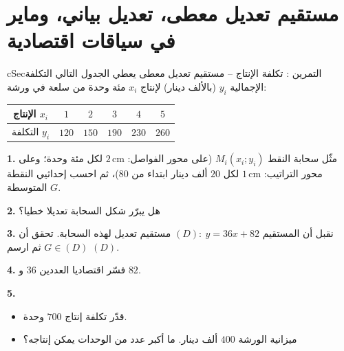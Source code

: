 \documentclass[12pt,a4paper]{article}
\newenvironment{BOX}[2]{\begin{otherlanguage}{english}\begin{arbox}{#1}{#2}}{\end{arbox}\end{otherlanguage}}
\newcounter{exo}
\newenvironment{tamrin}[1]{\stepcounter{exo}\begin{BOX}{cSec}{التمرين \theexo: #1}}{\end{BOX}}
\newenvironment{LTR}{\begin{otherlanguage}{english}}{\end{otherlanguage}}
\newcommand{\ar}[1]{\foreignlanguage{arabic}{#1}}
\newenvironment{sq}{\begin{itemize}[leftmargin=2.4em,itemsep=3pt]}{\end{itemize}}
\newcommand{\qa}{\item[(أ)]}\newcommand{\qb}{\item[(ب)]}\newcommand{\qc}{\item[(جـ)]}\newcommand{\qd}{\item[(د)]}\newcommand{\qe}{\item[(هـ)]}
\newcommand{\QQ}[1]{\par\smallskip\textbf{#1.} }
\begin{document}
\section{مستقيم تعديل معطى، تعديل بياني، وماير في سياقات اقتصادية}
\begin{tamrin}{تكلفة الإنتاج -- مستقيم تعديل معطى}
يعطي الجدول التالي التكلفة الإجمالية $y_i$ (بالألف دينار) لإنتاج $x_i$ مئة وحدة من سلعة في ورشة:
\begin{center}\begin{LTR}\renewcommand{\arraystretch}{1.35}\small
\begin{tabular}{|c|c|c|c|c|c|}\hline
\rowcolor{cSec!12}\ar{الإنتاج} $x_i$ & $1$ & $2$ & $3$ & $4$ & $5$\\\hline
\ar{التكلفة} $y_i$ & $120$ & $150$ & $190$ & $230$ & $260$\\\hline
\end{tabular}\end{LTR}\end{center}
\QQ{1} مثّل سحابة النقط $M_i(x_i;y_i)$ (على محور الفواصل: $2\,\text{cm}$ لكل مئة وحدة؛ وعلى محور التراتيب: $1\,\text{cm}$ لكل $20$ ألف دينار ابتداء من $80$)، ثم احسب إحداثيي النقطة المتوسطة $G$.
\QQ{2} هل يبرّر شكل السحابة تعديلا خطيا؟
\QQ{3} نقبل أن المستقيم $(D):\ y=36x+82$ مستقيم تعديل لهذه السحابة. تحقق أن $G\in(D)$ ثم ارسم $(D)$.
\QQ{4} فسّر اقتصاديا العددين $36$ و $82$.
\QQ{5}
\begin{sq}
\qa قدّر تكلفة إنتاج $700$ وحدة.
\qb ميزانية الورشة $400$ ألف دينار. ما أكبر عدد من الوحدات يمكن إنتاجه؟
\end{sq}
\end{tamrin}
\end{document}

